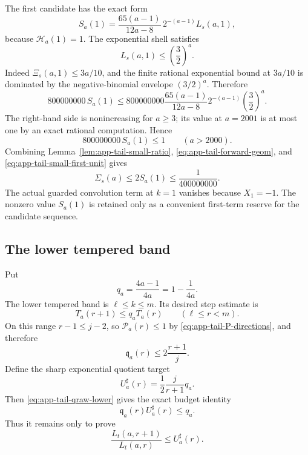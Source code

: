 \documentclass[11pt]{article}
\theoremstyle{definition}
\theoremstyle{remark}
\begin{document}
The first candidate has the exact form
\begin{equation}\label{eq:app-tail-S1}
 S_a(1)=\frac{65(a-1)}{12a-8}\,2^{-(a-1)}L_s(a,1),
\end{equation}
because $\mathcal H_a(1)=1$.  The exponential shell satisfies
\begin{equation}\label{eq:app-tail-small-shell}
 L_s(a,1)\le\left(\frac32\right)^a.
\end{equation}
Indeed $\Xi_s(a,1)\le3a/10$, and the finite rational exponential bound at
$3a/10$ is dominated by the negative-binomial envelope $(3/2)^a$.
Therefore
\begin{equation}\label{eq:app-tail-small-envelope}
 800000000\,S_a(1)
 \le
 800000000\frac{65(a-1)}{12a-8}
 2^{-(a-1)}\left(\frac32\right)^a.
\end{equation}
The right-hand side is nonincreasing for $a\ge3$; its value at $a=2001$ is
at most one by an exact rational computation.  Hence
\begin{equation}\label{eq:app-tail-small-first-unit}
 800000000\,S_a(1)\le1\qquad(a>2000).
\end{equation}
Combining Lemma~\ref{lem:app-tail-small-ratio},
\eqref{eq:app-tail-forward-geom}, and
\eqref{eq:app-tail-small-first-unit} gives
\begin{equation}\label{eq:app-tail-small-budget}
 \Sigma_s(a)\le2S_a(1)\le\frac1{400000000}.
\end{equation}
The actual guarded convolution term at $k=1$ vanishes because $X_1=-1$.
The nonzero value $S_a(1)$ is retained only as a convenient first-term reserve
for the candidate sequence.

\subsection{The lower tempered band}

Put
\begin{equation}\label{eq:app-tail-q}
 q_a=\frac{4a-1}{4a}=1-\frac1{4a}.
\end{equation}
The lower tempered band is $\ell\le k\le m$.  Its desired step estimate is
\begin{equation}\label{eq:app-tail-temp-lower-step}
 T_a(r+1)\le q_aT_a(r)
 \qquad(\ell\le r<m).
\end{equation}
On this range $r-1\le j-2$, so
$\mathcal P_a(r)\le1$ by \eqref{eq:app-tail-P-directions}, and therefore
\begin{equation}\label{eq:app-tail-qraw-lower}
 \mathfrak q_a(r)\le2\frac{r+1}{j}.
\end{equation}
Define the sharp exponential quotient target
\begin{equation}\label{eq:app-tail-U}
 U^{\sharp}_a(r)=\frac12\frac{j}{r+1}q_a.
\end{equation}
Then \eqref{eq:app-tail-qraw-lower} gives the exact budget identity
\begin{equation}\label{eq:app-tail-U-budget}
 \mathfrak q_a(r)U^{\sharp}_a(r)\le q_a.
\end{equation}
Thus it remains only to prove
\begin{equation}\label{eq:app-tail-Lt-forward-target}
 \frac{L_t(a,r+1)}{L_t(a,r)}\le U^{\sharp}_a(r).
\end{equation}
\end{document}
